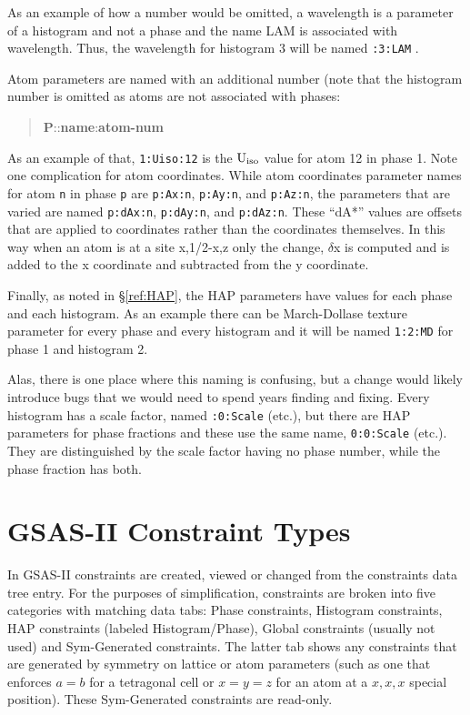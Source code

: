 As an example of how a number would be omitted, a wavelength is a parameter of a histogram and not a phase and the name LAM is associated with wavelength. Thus, the wavelength for histogram 3 will be named \texttt{:3:LAM} . 

Atom parameters are named with an additional number (note that the histogram number is omitted as atoms are not associated with phases:
\begin{quote}
    \textbf{P}::\textbf{name}:\textbf{atom-num}
\end{quote}
As an example of that, \texttt{1:Uiso:12} is the $\rm U_{iso}$ value for atom 12 in phase 1. Note one complication for atom coordinates. While atom coordinates parameter names for atom \texttt{n} in phase \texttt{p} are \texttt{p:Ax:n}, \texttt{p:Ay:n}, and \texttt{p:Az:n},  the parameters that are varied are named  \texttt{p:dAx:n}, \texttt{p:dAy:n}, and \texttt{p:dAz:n}. These ``dA*'' values are offsets that are applied to coordinates rather than the coordinates themselves. In this way when an atom is at a site x,1/2-x,z only the change, $\delta$x is computed and is added to the x coordinate and subtracted from the y coordinate. 

Finally, as noted in \S\ref{ref:HAP}, the HAP parameters have values for each phase and each histogram. As an example there can be March-Dollase texture parameter for every phase and every histogram and it will be named \texttt{1:2:MD} for phase 1 and histogram 2. 

Alas, there is one place where this naming is confusing, but a change would likely introduce bugs that we would need to spend years finding and fixing. Every histogram has a scale factor, named \texttt{:0:Scale} (etc.), but there are HAP parameters for phase fractions and these use the same name, \texttt{0:0:Scale} (etc.). They are distinguished by the scale factor having no phase number, while the phase fraction has both. 

\section{GSAS-II Constraint Types}

In GSAS-II constraints are created, viewed or changed from the constraints data tree entry. For the purposes of simplification, constraints are broken into five categories with matching data tabs: Phase constraints, Histogram constraints, HAP constraints (labeled Histogram/Phase), Global constraints (usually not used) and Sym-Generated constraints. The latter tab shows any constraints that are generated by symmetry on lattice or atom parameters (such as one that enforces $a=b$ for a tetragonal cell or $x=y=z$ for an atom at a $x,x,x$ special position). These Sym-Generated constraints are read-only. 

